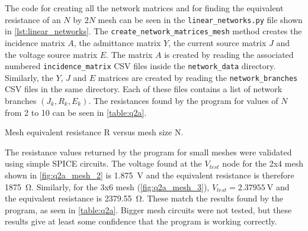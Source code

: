 \documentclass[a4paper,titlepage]{article}
\begin{document}
	The code for creating all the network matrices and for finding the equivalent resistance of an $N$ by $2N$ mesh can be seen in the \texttt{linear_networks.py} file shown in \autoref{lst:linear_networks}. The \texttt{create_network_matrices_mesh} method creates the incidence matrix $A$, the admittance matrix $Y$, the current source matrix $J$ and the voltage source matrix $E$. The matrix $A$ is created by reading the associated numbered \texttt{incidence_matrix} CSV files inside the \texttt{network_data} directory. Similarly, the $Y$, $J$ and $E$ matrices are created by reading the \texttt{network_branches} CSV files in the same directory. Each of these files contains a list of network branches $(J_k, R_k, E_k)$. The resistances found by the program for values of $N$ from 2 to 10 can be seen in \autoref{table:q2a}.
	
	\begin{table}[!htb]
		\centering
		\caption{Mesh equivalent resistance R versus mesh size N.}
		\label{table:q2a}
	\end{table}

	The resistance values returned by the program for small meshes were validated using simple SPICE circuits. The voltage found at the $V_{test}$ node for the 2x4 mesh shown in \autoref{fig:q2a_mesh_2} is \SI{1.875}{\volt} and the equivalent resistance is therefore \SI{1875}{\ohm}. Similarly, for the 3x6 mesh
	 (\autoref{fig:q2a_mesh_3}), $V_{test} = \SI{2.37955}{\volt}$ and the equivalent resistance is \SI{2379.55}{\ohm}. These match the results found by the program, as seen in \autoref{table:q2a}. Bigger mesh circuits were not tested, but these results give at least some confidence that the program is working correctly.
	
\end{document}
